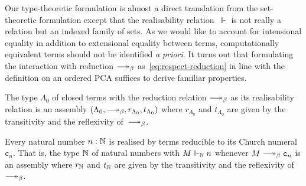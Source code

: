 \documentclass[a4paper,UKenglish,numberwithinsect,cleveref,thm-restate]{lipics-v2021}
\numberwithin{equation}{section}
\theoremstyle{definition}
\theoremstyle{plain}
\begin{document}
Our type-theoretic formulation is almost a direct translation from the set-theoretic formulation except that the realisability relation~$\Vdash$ is not really a relation but an indexed family of sets.
As we would like to account for intensional equality in addition to extensional equality between terms,
computationally equivalent terms should not be identified \emph{a priori}.
It turns out that formulating the interaction with reduction $\reduce$ as~\eqref{eq:respect-reduction} in line with the definition on an ordered PCA suffices to derive familiar properties.

\begin{example}\label{ex:assembly-lambda}
  The type $\Lambda_0$ of closed terms with the reduction relation ${\reduce}$ as its realisability relation is an assembly $(\Lambda_0, \reduce, r_{\Lambda_0}, t_{\Lambda_0})$ where $r_{\Lambda_0}$ and $t_{\Lambda_0}$ are given by the transitivity and the reflexivity of~$\reduce$.
\end{example}

\begin{example} \label{ex:assembly-naturals}
  Every natural number $n : \mathbb{N}$ is realised by terms reducible to its Church numeral~$\mathtt{c}_n$.
  That is, the type $\mathbb{N}$ of natural numbers with $M \Vdash_\mathbb{N} n$ whenever $M \reduce \mathtt{c}_n$ is an assembly where $r_\mathbb{N}$ and $t_\mathbb{N}$ are given by the transitivity and the reflexivity of~$\reduce$.
\end{example}
\end{document}

